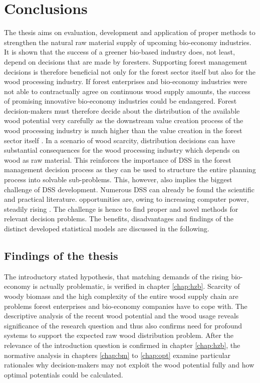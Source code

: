 \chapter{Conclusions}
\label{chap:discussion}
\newpage
\noindent
The thesis aims on evaluation, development and application of proper methods to strengthen the natural raw material supply of upcoming bio-economy industries. It is shown that the success of a greener bio-based industry does, not least, depend on decisions that are made by foresters. Supporting forest management decisions is therefore beneficial not only for the forest sector itself but also for the wood processing industry. If forest enterprises and bio-economy industries were not able to contractually agree on continuous wood supply amounts, the success of promising innovative bio-economy industries could be endangered. Forest decision-makers must therefore decide about the distribution of the available wood potential very carefully as the downstream value creation process of the wood processing industry is much higher than the value creation in the forest sector itself \citep[p. 221,223]{elchichakli_2016}. In a scenario of wood scarcity, distribution decisions can have substantial consequences for the wood processing industry which depends on wood as raw material. This reinforces the importance of DSS in the forest management decision process as they can be used to structure the entire planning process into solvable sub-problems. This, however, also implies the biggest challenge of DSS development. Numerous DSS can already be found the scientific and practical literature. opportunities are, owing to increasing computer power, steadily rising \citep[p. 1065-1067]{pretzsch_2008}. The challenge is hence to find proper and novel methods for relevant decision problems. The benefits, disadvantages and findings of the distinct developed statistical models are discussed in the following.

\section{Findings of the thesis}
\label{sec:discussion:findings}
The introductory stated hypothesis, that matching demands of the rising bio-economy is actually problematic, is verified in chapter \ref{chap:hzb}. Scarcity of woody biomass and the high complexity of the entire wood supply chain are problems forest enterprises and bio-economy companies have to cope with. The descriptive analysis of the recent wood potential and the wood usage reveals significance of the research question and thus also confirms need for profound systems to support the expected raw wood distribution problem. After the relevance of the introduction question is confirmed in chapter \ref{chap:hzb}, the normative analysis in chapters \ref{chap:bm} to \ref{chap:opt} examine particular rationales why decision-makers may not exploit the wood potential fully and how optimal potentials could be calculated.

